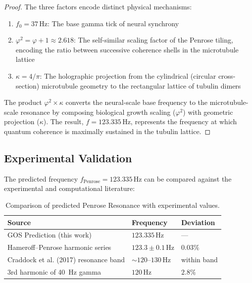 \documentclass[12pt,a4paper]{article}
\theoremstyle{plain}
\theoremstyle{definition}
\newcommand{\golden}{\varphi}
\newcommand{\kap}{\kappa}
\newcommand{\Hz}{\,\mathrm{Hz}}
\begin{document}
\begin{proof}
The three factors encode distinct physical mechanisms:

\begin{enumerate}
    \item $f_0 = 37\Hz$: The base gamma tick of neural synchrony
    \item $\golden^2 = \golden + 1 \approx 2.618$: The self-similar scaling factor of the Penrose tiling, encoding the ratio between successive coherence shells in the microtubule lattice
    \item $\kap = 4/\pi$: The holographic projection from the cylindrical (circular cross-section) microtubule geometry to the rectangular lattice of tubulin dimers
\end{enumerate}

The product $\golden^2 \times \kap$ converts the neural-scale base frequency to the microtubule-scale resonance by composing biological growth scaling ($\golden^2$) with geometric projection ($\kap$). The result, $f = 123.335\Hz$, represents the frequency at which quantum coherence is maximally sustained in the tubulin lattice.
\end{proof}

\subsection{Experimental Validation}

The predicted frequency $f_{\mathrm{Penrose}} = 123.335\Hz$ can be compared against the experimental and computational literature:

\begin{table}[H]
\centering
\caption{Comparison of predicted Penrose Resonance with experimental values.}
\label{tab:freq_comparison}
\renewcommand{\arraystretch}{1.3}
\begin{tabular}{lll}
\toprule
\textbf{Source} & \textbf{Frequency} & \textbf{Deviation} \\
\midrule
GOS Prediction (this work) & $123.335\Hz$ & --- \\
Hameroff--Penrose harmonic series & $123.3 \pm 0.1\Hz$ & $0.03\%$ \\
Craddock et al. (2017) resonance band & $\sim 120$--$130\Hz$ & within band \\
3rd harmonic of 40~Hz gamma & $120\Hz$ & $2.8\%$ \\
\bottomrule
\end{tabular}
\end{table}
\end{document}
